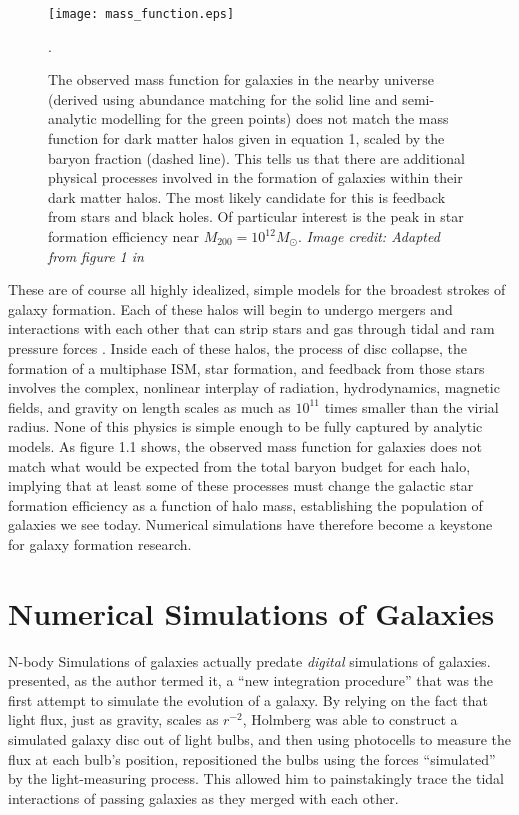 \begin{figure}
    \texttt{[image: mass\_function.eps]}
    \caption[Galaxy mass function]{The observed mass function for galaxies in
    the nearby universe (derived using abundance matching for the solid line and
    semi-analytic modelling for the green points) does not match the mass
    function for dark matter halos given in equation 1, scaled by the baryon
    fraction (dashed line).  This tells us that there are additional physical
    processes involved in the formation of galaxies within their dark matter
    halos.  The most likely candidate for this is feedback from stars and black
    holes.  Of particular interest is the peak in star formation efficiency near
    $M_{200}=10^{12}M_\odot$.  \textit{Image credit: Adapted from figure 1 in
    \citet{Ferrero2012}}}.
\end{figure}

These are of course all highly idealized, simple models for the broadest strokes
of galaxy formation.  Each of these halos will begin to undergo mergers and
interactions \citet{Navarro1993,Kauffmann1999,Cole2000} with each other that can
strip stars and gas through tidal and ram pressure forces
\citep{Gunn1972,Dressler1980}.  Inside each of these halos, the process of disc
collapse, the formation of a multiphase ISM, star formation, and feedback from
those stars involves the complex, nonlinear interplay of radiation,
hydrodynamics, magnetic fields, and gravity on length scales as much as
$10^{11}$ times smaller than the virial radius.  None of this physics is simple
enough to be fully captured by analytic models. As figure 1.1 shows, the
observed mass function for galaxies does not match what would be expected from
the total baryon budget for each halo, implying that at least some of these
processes must change the galactic star formation efficiency as a function of
halo mass, establishing the population of galaxies we see today.  Numerical
simulations have therefore become a keystone for galaxy formation research.


\section{Numerical Simulations of Galaxies}
N-body Simulations of galaxies actually predate {\it digital} simulations of
galaxies.  \citet{Holmberg1941} presented, as the author termed it, a ``new
integration procedure'' that was the first attempt to simulate the
evolution of a galaxy.  By relying on the fact that light flux, just as gravity,
scales as $r^{-2}$, Holmberg was able to construct a simulated galaxy disc out
of light bulbs, and then using photocells to measure the flux at each bulb's
position, repositioned the bulbs using the forces ``simulated'' by the
light-measuring process.  This allowed him to painstakingly trace the tidal
interactions of passing galaxies as they merged with each other.


